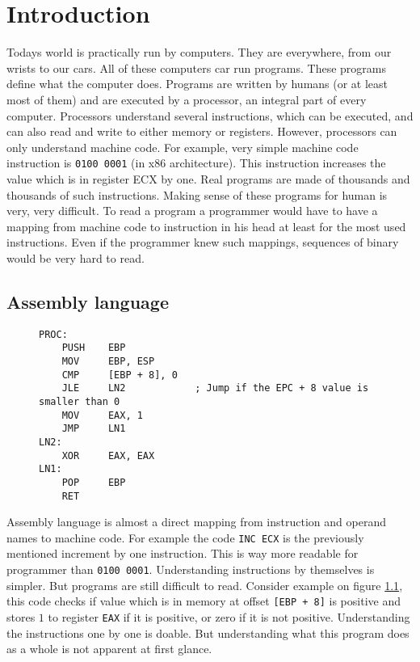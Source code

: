 \chapter{Introduction}
Todays world is practically run by computers. They are everywhere, from our wrists to our cars.
All of these computers car run programs. These programs define what the computer does.
Programs are written by humans (or at least most of them) and are executed by a processor, 
an integral part of every computer. Processors understand several instructions,
which can be executed, and can also read and write to either memory or registers. However, processors can only
understand machine code. For example, very simple machine code instruction is \texttt{0100 0001} (in x86 architecture).
This instruction increases the value which is in register ECX by one. Real programs are made of thousands and thousands of
such instructions. Making sense of these programs for human is very, very difficult. To read a program a programmer would
have to have a mapping from machine code to instruction in his head at least for the most used instructions. Even if the
programmer knew such mappings, sequences of binary would be very hard to read. 

\section{Assembly language}
\begin{figure}\label{fig:assembly-example}
\begin{lstlisting}
PROC:
    PUSH    EBP
    MOV     EBP, ESP
    CMP     [EBP + 8], 0
    JLE     LN2            ; Jump if the EPC + 8 value is smaller than 0
    MOV     EAX, 1
    JMP     LN1
LN2:
    XOR     EAX, EAX
LN1:
    POP     EBP
    RET
\end{lstlisting}
\end{figure}
Assembly language is almost a direct mapping from instruction and operand names to machine code. For example the code \texttt{INC ECX} is the previously mentioned increment by one instruction. This is way more readable for programmer than \texttt{0100 0001}. Understanding instructions by themselves is simpler. But programs are still difficult to read. Consider example on figure \ref{fig:assembly-example}, this code checks if value which is in memory at offset \texttt{[EBP + 8]} is positive and stores $1$ to register \texttt{EAX} if it is positive, or zero if it is not positive. Understanding the instructions one by one is doable. But understanding what this program does as a whole is not apparent at first glance. 

